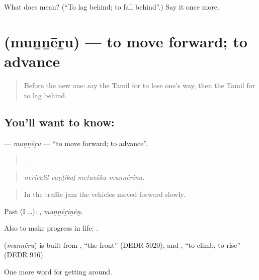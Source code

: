 \begin{tcolorbox}[breakable,colback=teal!4,colframe=teal!35!black,title={Before you move on}]
What does  mean? (\textquotedblleft{}To lag behind; to fall behind\textquotedblright{}.) Say it once more.
\end{tcolorbox}
\section[\texorpdfstring{\ta{முன்னேறு} (muṉṉēṟu)}{முன்னேறு (muṉṉēṟu)}]{ (muṉṉēṟu) — to move forward; to advance}

\label{lesson:TA-C412-munneru}



\begin{quote}
Before the new one: say the Tamil for to lose one's way, then the Tamil for to lag behind.
\end{quote}

\subsection*{You'll want to know: }
\textbf{} — \emph{muṉṉēṟu} — \textquotedblleft{}to move forward; to advance\textquotedblright{}.

\begin{quote}
   .
\end{quote}

\begin{quote}
\emph{nericalil vaṇṭikaḷ metuvāka muṉṉēṟiṉa.}
\end{quote}

\begin{quote}
In the traffic jam the vehicles moved forward slowly.
\end{quote}

Past (I …): , \emph{muṉṉēṟiṉēṉ}.

Also to make progress in life:   .

\begin{cousinweb}
\textbf{} (\emph{muṉṉēṟu}) is built from , \textquotedblleft{}the front\textquotedblright{} (DEDR 5020), and , \textquotedblleft{}to climb, to rise\textquotedblright{} (DEDR 916).
\end{cousinweb}

\begin{grammarlens}[title={What you've built}]
One more word for getting around.
\end{grammarlens}

